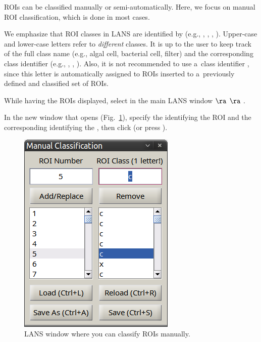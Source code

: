 ROIs can be classified manually or semi-automatically. Here, we focus on manual ROI classification, which is done in most cases. 

\nb
We emphasize that ROI classes in LANS are identified by  (e.g., , , , ). Upper-case and lower-case letters refer to \emph{different} classes. It is up to the user to keep track of the full class name (e.g., algal cell, bacterial cell, filter) and the corresponding class identifier (e.g., , , ). Also, it is not recommended to use a~class identifier , since this letter is automatically assigned to ROIs inserted to a~previously defined and classified set of ROIs.

\setcounter{step}{0}

\s While having the ROIs displayed, select in the main LANS window  $\ra$  $\ra$ .

\s In the new window that opens (Fig.~\ref{fig:roi-classification}), specify the  identifying the ROI and the corresponding  identifying the , then click  (or press ).

\begin{figure}[!ht]
\centering
\includegraphics[scale=0.4]{figs3/LANS-roi-classification}
\caption{\label{fig:roi-classification}%
LANS window where you can classify ROIs manually.}
\end{figure}


